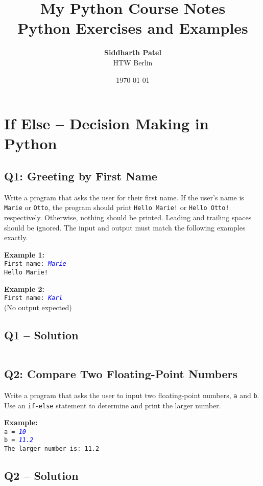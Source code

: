 \documentclass[a4paper,11pt]{article}
\title{\Huge \textbf{My Python Course Notes}\\[1ex]
	\Large Python Exercises and Examples}
\author{\textbf{Siddharth Patel} \\ HTW Berlin}
\date{\today}
\begin{document}
	
	\maketitle
	\thispagestyle{empty}
	\newpage
	\tableofcontents
	\newpage

	
	\section{If Else – Decision Making in Python}
	
	\subsection*{Q1: Greeting by First Name}
	Write a program that asks the user for their first name. If the user's name is \texttt{Marie} or \texttt{Otto}, the program should print \texttt{Hello Marie!} or \texttt{Hello Otto!} respectively. Otherwise, nothing should be printed. Leading and trailing spaces should be ignored. The input and output must match the following examples exactly.
	
	\textbf{Example 1:}\\
	\texttt{First name: \textcolor{blue}{\textit{Marie}}}\\
	\texttt{Hello Marie!}
	
	\textbf{Example 2:}\\
	\texttt{First name: \textcolor{blue}{\textit{Karl}}}\\
	(No output expected)
	
		\subsection*{Q1 – Solution}
		\inputminted{python}{Files/1/1.py}
	
	\subsection*{Q2: Compare Two Floating-Point Numbers}
	Write a program that asks the user to input two floating-point numbers, \texttt{a} and \texttt{b}. Use an \texttt{if-else} statement to determine and print the larger number.
	
	\textbf{Example:}\\
	\texttt{a = \textcolor{blue}{\textit{10}}}\\
	\texttt{b = \textcolor{blue}{\textit{11.2}}}\\
	\texttt{The larger number is: 11.2}
	
		
	\subsection*{Q2 – Solution}
		\inputminted{python}{Files/1/2.py}
	
\end{document}

